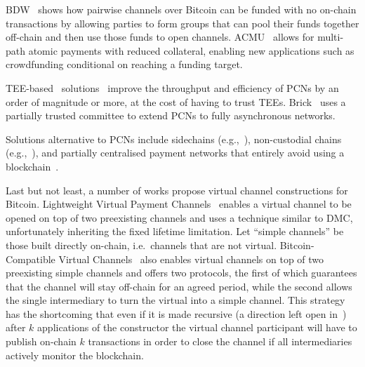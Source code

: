   BDW~\cite{scalable-funding} shows how pairwise channels over Bitcoin can be   funded with no on-chain transactions by allowing parties to form groups that   can pool their funds together off-chain and then use those funds to open   channels. ACMU~\cite{10.1145/3319535.3345666} allows for multi-path atomic   payments with reduced collateral, enabling new applications such as   crowdfunding conditional on reaching a funding target.

  TEE-based~\cite{zhao2019sok}
solutions~\cite{teechan,10.1145/3341301.3359627,liao2021speedster,lee2020routee}
  improve the throughput and efficiency of PCNs by an order of magnitude or
  more, at the cost of having to trust TEEs. Brick~\cite{avarikioti2020brick}
  uses a partially trusted committee to extend PCNs to fully asynchronous
  networks.

  Solutions alternative to PCNs include 
side\-chains (e.g.,~\cite{BCDF+14,sidechains,KiaZin18}),
non-custo\-dial chains (e.g.,~\cite{plasma,konstantopoulos2019plasma,plasma-lower-bounds,rollup}),
  and partially centralised payment networks that entirely avoid using a blockchain~\cite{DBLP:conf/trust/ArmknechtKMYZ15,stellar,silentwhispers,DBLP:conf/ndss/RoosMKG18}. 

  Last but not least, a number of works propose virtual channel constructions
  for Bitcoin. Lightweight Virtual Payment
  Channels~\cite{10.1007/978-3-030-65411-5_18} enables a virtual channel to be
  opened on top of two preexisting channels and uses a technique similar to DMC,
  unfortunately inheriting the fixed lifetime limitation.
  Let ``simple channels'' be those built directly on-chain, i.e.\ channels that are not
  virtual.
  Bitcoin-Compatible Virtual Channels~\cite{cryptoeprint:2020:554} also enables
  virtual channels on top of two preexisting simple channels
  and offers two protocols, the first of which guarantees that the channel will
  stay off-chain for an agreed period, while the second allows the single intermediary
  to turn the virtual into a simple channel.
  This strategy has the shortcoming that even if it is made
  recursive (a direction left open in~\cite{cryptoeprint:2020:554}) after $k$
  applications of the constructor the virtual channel participant will have to
  publish on-chain $k$ transactions in order to close the channel if all
  intermediaries actively monitor the blockchain.

